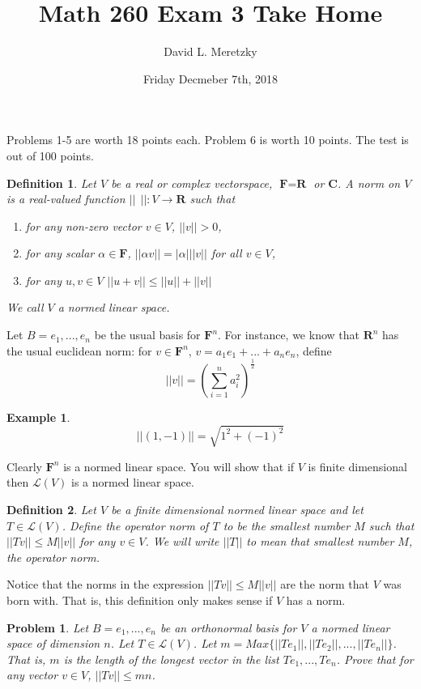 \documentclass{article}
\title{ \vspace{-10ex} %
Math 260 Exam 3 Take Home
}
\author{David L. Meretzky
}
\date{%
Friday Decmeber 7th, 2018
}
\theoremstyle{problemstyle}
\newtheorem{problem}{Problem}
\theoremstyle{problemstyle}
\theoremstyle{problemstyle}
\newtheorem{example}{Example}
\theoremstyle{problemstyle}
\newtheorem{definition}{Definition}
\begin{document}
\maketitle

\noindent
Problems 1-5 are worth 18 points each. Problem 6 is worth 10 points. The test is out of 100 points. 

\begin{definition}
Let $V$ be a real or complex vectorspace, $\textbf{F} = \textbf{R}$ or $\textbf{C}$. A norm on $V$ is a real-valued function $||\ \  ||:V \rightarrow \textbf{R}$ such that 
\begin{enumerate}
\item for any non-zero vector $v \in V$, $||v|| > 0$, 
\item for any scalar $\alpha \in \textbf{F}$, $||\alpha v|| = |\alpha|||v||$ for all $v \in V$,
\item for any $u,v \in V$ $||u+v|| \leq ||u|| + ||v||$
\end{enumerate}
We call $V$ a normed linear space. 
\end{definition}


\flushleft
Let $B = e_1,...,e_n$ be the usual basis for $\textbf{F}^n$. For instance, we know that $\textbf{R}^n$ has the usual euclidean norm: for $v \in  \textbf{F}^n$, $v = a_1e_1 +...+a_ne_n$, define 
\begin{equation}||v|| = (\sum_{i = 1}^na_i^2)^{\frac{1}{2}}\end{equation}

\begin{example}
$$||(1,-1)|| = \sqrt{1^2+(-1)^2}$$
\end{example}

Clearly $\textbf{F}^n$ is a normed linear space. You will show that if $V$ is finite dimensional then $\mathscr{L}(V)$ is a normed linear space. 

\begin{definition}
Let $V$ be a finite dimensional normed linear space and let  $T \in \mathscr{L}(V)$. Define the operator norm of $T$ to be the smallest number $M$ such that $||Tv|| \leq M||v||$ for any $v \in V$. We will write $||T||$ to mean that smallest number $M$, the operator norm. 
\end{definition}

\flushleft
Notice that the norms in the expression $||Tv|| \leq M||v||$ are the norm that $V$ was born with. That is, this definition only makes sense if $V$ has a norm. 

\begin{problem}
Let $B = e_1,...,e_n$ be an orthonormal basis for $V$ a normed linear space of dimension $n$. Let $T \in \mathscr{L}(V)$. Let $m = Max\{||Te_1||,||Te_2||,...,||Te_n||\}$. That is, $m$ is the length of the longest vector in the list $Te_1,...,Te_n$. Prove that for any vector $v \in V$, $||Tv|| \leq mn$. 
\end{problem}
\end{document}
